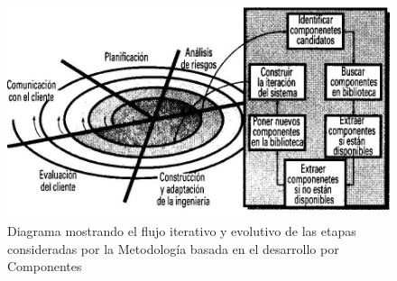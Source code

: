 \begin{figure}[!h]
	\centering
	\includegraphics[width=17cm]{Imagenes/Modelo_componentes.jpeg}
	\caption{Diagrama mostrando el flujo iterativo y evolutivo de las etapas consideradas por la Metodología basada en el desarrollo por Componentes}
	\label{Metodologia_componentes}
\end{figure}